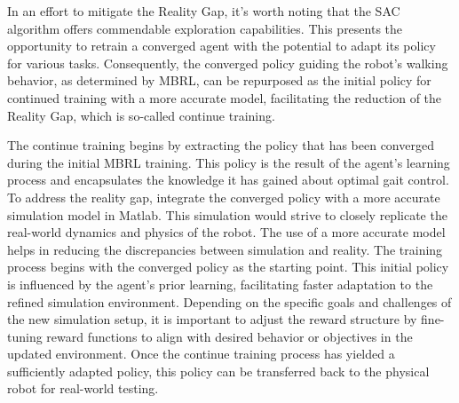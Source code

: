 In an effort to mitigate the Reality Gap, it's worth noting that the SAC algorithm offers commendable exploration capabilities. This presents the opportunity to retrain a converged agent with the potential to adapt its policy for various tasks. Consequently, the converged policy guiding the robot's walking behavior, as determined by MBRL, can be repurposed as the initial policy for continued training with a more accurate model, facilitating the reduction of the Reality Gap, which is so-called continue training.

The continue training begins by extracting the policy that has been converged during the initial MBRL training. This policy is the result of the agent's learning process and encapsulates the knowledge it has gained about optimal gait control. To address the reality gap, integrate the converged policy with a more accurate simulation model in Matlab. This simulation would strive to closely replicate the real-world dynamics and physics of the robot. The use of a more accurate model helps in reducing the discrepancies between simulation and reality. The training process begins with the converged policy as the starting point. This initial policy is influenced by the agent's prior learning, facilitating faster adaptation to the refined simulation environment. Depending on the specific goals and challenges of the new simulation setup, it is important to adjust the reward structure by fine-tuning reward functions to align with desired behavior or objectives in the updated environment. Once the continue training process has yielded a sufficiently adapted policy, this policy can be transferred back to the physical robot for real-world testing. 